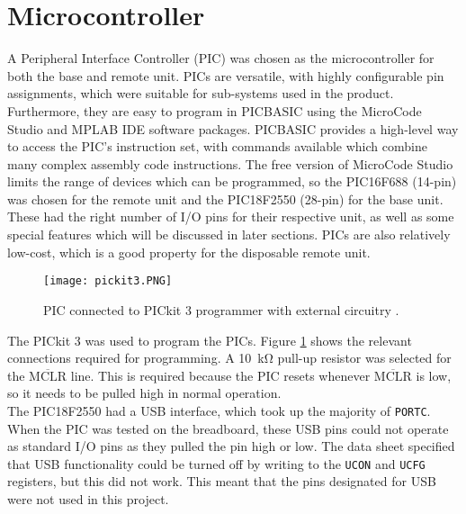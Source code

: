 \section{Microcontroller}
A Peripheral Interface Controller (PIC) was chosen as the microcontroller for both the base and remote unit. PICs are versatile, with highly configurable pin assignments, which were suitable for sub-systems used in the product. Furthermore, they are easy to program in PICBASIC using the MicroCode Studio \cite{microcode_studio} and MPLAB IDE software packages. PICBASIC provides a high-level way to access the PIC's instruction set, with commands available which combine many complex assembly code instructions. The free version of MicroCode Studio limits the range of devices which can be programmed, so the PIC16F688 (14-pin) \cite{pic16f688} was chosen for the remote unit and the PIC18F2550 (28-pin) \cite{pic18f2550} for the base unit. These had the right number of I/O pins for their respective unit, as well as some special features which will be discussed in later sections. PICs are also relatively low-cost, which is a good property for the disposable remote unit.\\

\begin{figure}[htb]
	\centering
	\texttt{[image: pickit3.PNG]}
	\caption{PIC connected to PICkit 3 programmer with external circuitry \cite{pickit3}.}
	\label{fig: pickit3}
\end{figure}

The PICkit 3 \cite{pickit3} was used to program the PICs. Figure \ref{fig: pickit3} shows the relevant connections required for programming. A \SI{10}{\kilo\ohm} pull-up resistor was selected for the $\overline{\text{MCLR}}$ line. This is required because the PIC resets whenever $\overline{\text{MCLR}}$ is low, so it needs to be pulled high in normal operation. \\

The PIC18F2550 had a USB interface, which took up the majority of \verb|PORTC|. When the PIC was tested on the breadboard, these USB pins could not operate as standard I/O pins as they pulled the pin high or low. The data sheet specified that USB functionality could be turned off by writing to the \verb|UCON| and \verb|UCFG| registers, but this did not work. This meant that the pins designated for USB were not used in this project.\\
